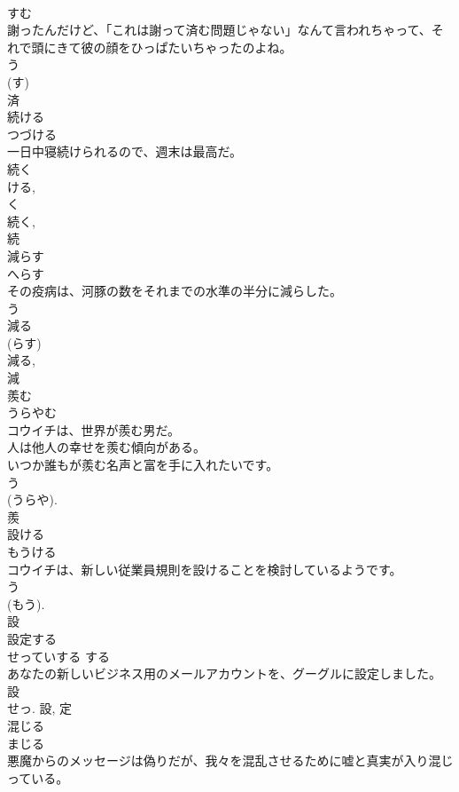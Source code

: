 \documentclass[8pt]{extreport}
\begin{document}
\begin{CJK}{UTF8}{min}
\\	すむ	
\\	謝ったんだけど、「これは謝って済む問題じゃない」なんて言われちゃって、それで頭にきて彼の顔をひっぱたいちゃったのよね。	
\\	う 
\\	(す) 
\\	済	
\\	続ける	
\\	つづける	
\\	一日中寝続けられるので、週末は最高だ。	
\\	続く 
\\	ける, 
\\	く 
\\	続く, 
\\	続	
\\	減らす	
\\	へらす	
\\	その疫病は、河豚の数をそれまでの水準の半分に減らした。	
\\	う 
\\	減る 
\\	(らす) 
\\	減る, 
\\	減	
\\	羨む	
\\	うらやむ	
\\	コウイチは、世界が羨む男だ。	
\\	人は他人の幸せを羨む傾向がある。	
\\	いつか誰もが羨む名声と富を手に入れたいです。	
\\	う 
\\	(うらや). 
\\	羨	
\\	設ける	
\\	もうける	
\\	コウイチは、新しい従業員規則を設けることを検討しているようです。	
\\	う 
\\	(もう). 
\\	設	
\\	設定する	
\\	せっていする	する 
\\	あなたの新しいビジネス用のメールアカウントを、グーグルに設定しました。	
\\	設 
\\	せっ.	設, 定	
\\	混じる	
\\	まじる	
\\	悪魔からのメッセージは偽りだが、我々を混乱させるために嘘と真実が入り混じっている。	

\end{CJK}
\end{document}
